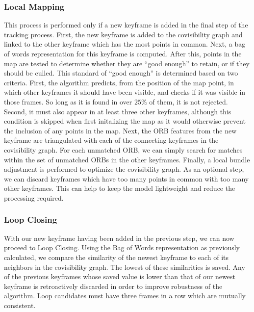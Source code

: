 \documentclass[twocolumn]{article}
\begin{document}
\subsubsection{Local Mapping}

This process is performed only if a new keyframe is added in the final step of the tracking process. First, the new keyframe is added to the covisibility graph and linked to the other keyframe which has the most points in common. Next, a bag of words representation for this keyframe is computed. After this, points in the map are tested to determine whether they are ``good enough'' to retain, or if they should be culled. This standard of ``good enough'' is determined based on two criteria. First, the algorithm predicts, from the position of the map point, in which other keyframes it should have been visible, and checks if it was visible in those frames. So long as it is found in over $25\%$ of them, it is not rejected. Second, it must also appear in at least three other keyframes, although this condition is skipped when first initalizing the map as it would otherwise prevent the inclusion of any points in the map.
Next, the ORB features from the new keyframe are triangulated with each of the connecting keyframes in the covisibility graph. For each unmatched ORB, we can simply search for matches within the set of unmatched ORBs in the other keyframes. Finally, a local bundle adjustment is performed to optimize the covisibility graph.
As an optional step, we can discard keyframes which have too many points in common with too many other keyframes. This can help to keep the model lightweight and reduce the processing required.

\subsubsection{Loop Closing}

With our new keyframe having been added in the previous step, we can now proceed to Loop Closing. Using the Bag of Words representation as previously calculated, we compare the similarity of the newest keyframe to each of its neighbors in the covisibility graph. The lowest of these similarities is saved. Any of the previous keyframes whose saved value is lower than that of our newest keyframe is retroactively discarded in order to improve robustness of the algorithm. Loop candidates must have three frames in a row which are mutually consistent.
\end{document}
